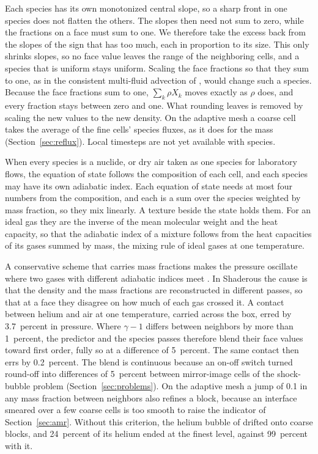 \documentclass[twocolumn]{aastex701}
\begin{document}
Each species has its own monotonized central slope, so a sharp front in one species does not flatten the others. The slopes then need not sum to zero, while the fractions on a face must sum to one. We therefore take the excess back from the slopes of the sign that has too much, each in proportion to its size. This only shrinks slopes, so no face value leaves the range of the neighboring cells, and a species that is uniform stays uniform. Scaling the face fractions so that they sum to one, as in the consistent multi-fluid advection of \citet{Plewa1999}, would change such a species. Because the face fractions sum to one, $\sum_k \rho X_k$ moves exactly as $\rho$ does, and every fraction stays between zero and one. What rounding leaves is removed by scaling the new values to the new density. On the adaptive mesh a coarse cell takes the average of the fine cells' species fluxes, as it does for the mass (Section~\ref{sec:reflux}). Local timesteps are not yet available with species.

When every species is a nuclide, or dry air taken as one species for laboratory flows, the equation of state follows the composition of each cell, and each species may have its own adiabatic index. Each equation of state needs at most four numbers from the composition, and each is a sum over the species weighted by mass fraction, so they mix linearly. A texture beside the state holds them. For an ideal gas they are the inverse of the mean molecular weight and the heat capacity, so that the adiabatic index of a mixture follows from the heat capacities of its gases summed by mass, the mixing rule of ideal gases at one temperature.

A conservative scheme that carries mass fractions makes the pressure oscillate where two gases with different adiabatic indices meet \citep{Abgrall1996, Karni1996}. In Shaderous the cause is that the density and the mass fractions are reconstructed in different passes, so that at a face they disagree on how much of each gas crossed it. A contact between helium and air at one temperature, carried across the box, erred by 3.7~percent in pressure. Where $\gamma - 1$ differs between neighbors by more than 1~percent, the predictor and the species passes therefore blend their face values toward first order, fully so at a difference of 5~percent. The same contact then errs by 0.2~percent. The blend is continuous because an on-off switch turned round-off into differences of 5~percent between mirror-image cells of the shock-bubble problem (Section~\ref{sec:problems}). On the adaptive mesh a jump of 0.1 in any mass fraction between neighbors also refines a block, because an interface smeared over a few coarse cells is too smooth to raise the indicator of Section~\ref{sec:amr}. Without this criterion, the helium bubble of \citet{QuirkKarni1996} drifted onto coarse blocks, and 24~percent of its helium ended at the finest level, against 99~percent with it.
\end{document}
